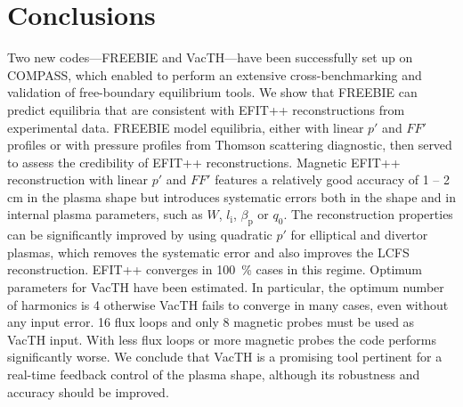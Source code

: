 
\section{Conclusions} %
\label{sec:conclusions}

Two new codes---FREEBIE and VacTH---have been successfully set up on COMPASS, which enabled to perform an extensive cross-benchmarking and validation of free-boundary equilibrium tools. We show that FREEBIE can predict equilibria that are consistent with EFIT++ reconstructions from experimental data. FREEBIE model equilibria, either with linear $p'$ and $FF'$ profiles or with pressure profiles from Thomson scattering diagnostic, then served to assess the credibility of EFIT++ reconstructions. 
Magnetic EFIT++ reconstruction with linear $p'$ and $FF'$ features a relatively good accuracy of 1 -- 2 cm in the plasma shape but introduces systematic errors both in the shape and in internal plasma parameters, such as $W$, $l_{\mathrm i}$, $\beta_{\mathrm p}$ or $q_0$. The reconstruction properties can be significantly improved by using quadratic $p'$ for elliptical and divertor plasmas, which removes the systematic error and also improves the LCFS reconstruction. EFIT++ converges in 100~\% cases in this regime.
Optimum parameters for VacTH have been estimated. In particular, the optimum number of harmonics is 4 otherwise VacTH fails to converge in many cases, even without any input error. 16 flux loops and only 8 magnetic probes must be used as VacTH input. With less flux loops or more magnetic probes the code performs significantly worse. We conclude that VacTH is a promising tool pertinent for a real-time feedback control of the plasma shape, although its robustness and accuracy should be improved.

